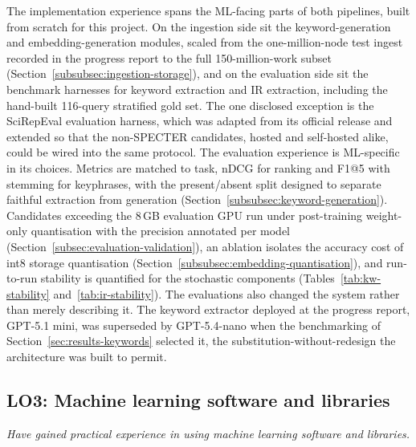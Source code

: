 The implementation experience spans the ML-facing parts of both
pipelines, built from scratch for this project. On the ingestion side sit
the keyword-generation and embedding-generation modules, scaled from the
one-million-node test ingest recorded in the progress report to the full
150-million-work subset (Section~\ref{subsubsec:ingestion-storage}), and on
the evaluation side sit the benchmark harnesses for keyword extraction
and IR extraction, including the hand-built 116-query stratified gold
set. The one disclosed exception is the SciRepEval evaluation harness,
which was adapted from its official release and extended so that the
non-SPECTER candidates, hosted and self-hosted alike, could be wired into
the same protocol. The evaluation experience is ML-specific in its
choices. Metrics are matched to task, nDCG for ranking and F1@5 with
stemming for keyphrases, with the present/absent split designed to
separate faithful extraction from generation
(Section~\ref{subsubsec:keyword-generation}). Candidates exceeding the
8\,GB evaluation GPU run under post-training weight-only quantisation
with the precision annotated per model
(Section~\ref{subsec:evaluation-validation}), an ablation isolates the
accuracy cost of int8 storage quantisation
(Section~\ref{subsubsec:embedding-quantisation}), and run-to-run
stability is quantified for the stochastic components
(Tables~\ref{tab:kw-stability} and~\ref{tab:ir-stability}). The
evaluations also changed the system rather than merely describing it. The
keyword extractor deployed at the progress report, GPT-5.1 mini, was
superseded by GPT-5.4-nano when the benchmarking of
Section~\ref{sec:results-keywords} selected it, the
substitution-without-redesign the architecture was built to permit.

\subsection{LO3: Machine learning software and libraries}
\textit{Have gained practical experience in using machine learning
software and libraries.}

